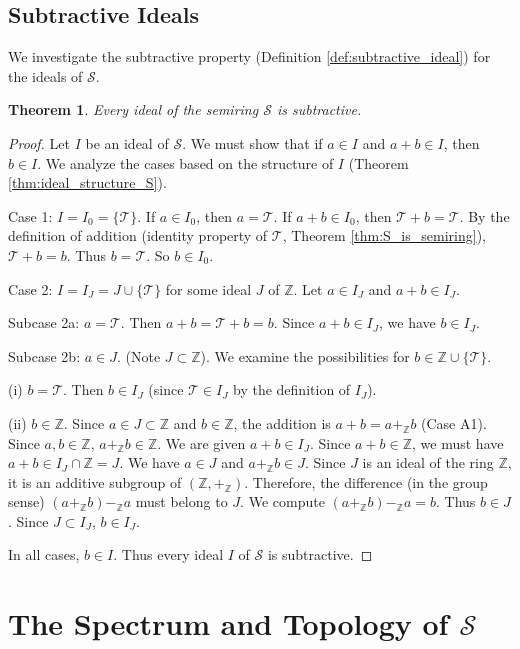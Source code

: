 \documentclass[11pt, a4paper]{article}
\theoremstyle{plain}
\newtheorem{theorem}{Theorem}[section]
\theoremstyle{definition}
\numberwithin{equation}{section}
\newcommand{\Z}{\mathbb{Z}}
\newcommand{\Tobj}{\mathcal{T}} %
\newcommand{\SemiringS}{\mathcal{S}}
\begin{document}
\subsection{Subtractive Ideals}

We investigate the subtractive property (Definition \ref{def:subtractive_ideal}) for the ideals of $\SemiringS$.

\begin{theorem}\label{thm:subtractive_ideals_S}
Every ideal of the semiring $\SemiringS$ is subtractive.
\end{theorem}
\begin{proof}
Let $I$ be an ideal of $\SemiringS$. We must show that if $a \in I$ and $a+b \in I$, then $b \in I$. We analyze the cases based on the structure of $I$ (Theorem \ref{thm:ideal_structure_S}).

Case 1: $I=I_0=\{\Tobj\}$.
If $a \in I_0$, then $a=\Tobj$.
If $a+b \in I_0$, then $\Tobj+b = \Tobj$. By the definition of addition (identity property of $\Tobj$, Theorem \ref{thm:S_is_semiring}), $\Tobj+b=b$. Thus $b=\Tobj$. So $b \in I_0$.

Case 2: $I=I_J=J\cup\{\Tobj\}$ for some ideal $J$ of $\Z$.
Let $a \in I_J$ and $a+b \in I_J$.

Subcase 2a: $a=\Tobj$.
Then $a+b = \Tobj+b = b$. Since $a+b \in I_J$, we have $b \in I_J$.

Subcase 2b: $a \in J$. (Note $J \subset \Z$).
We examine the possibilities for $b \in \Z \cup \{\Tobj\}$.

(i) $b=\Tobj$. Then $b \in I_J$ (since $\Tobj \in I_J$ by the definition of $I_J$).

(ii) $b \in \Z$.
Since $a \in J \subset \Z$ and $b \in \Z$, the addition is $a+b = a+_{\Z}b$ (Case A1).
Since $a, b \in \Z$, $a+_{\Z}b \in \Z$.
We are given $a+b \in I_J$. Since $a+b \in \Z$, we must have $a+b \in I_J \cap \Z = J$.
We have $a \in J$ and $a+_{\Z}b \in J$.
Since $J$ is an ideal of the ring $\Z$, it is an additive subgroup of $(\Z, +_{\Z})$.
Therefore, the difference (in the group sense) $(a+_{\Z}b) -_{\Z} a$ must belong to $J$.
We compute $(a+_{\Z}b) -_{\Z} a = b$.
Thus $b \in J$. Since $J \subset I_J$, $b \in I_J$.

In all cases, $b \in I$. Thus every ideal $I$ of $\SemiringS$ is subtractive.
\end{proof}

\section{The Spectrum and Topology of $\SemiringS$}
\end{document}
